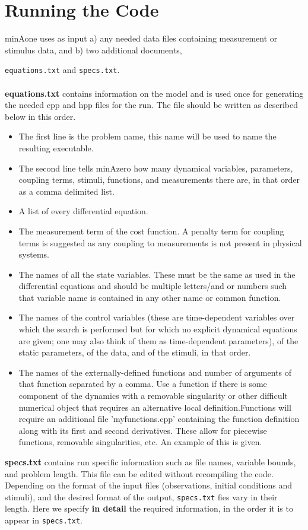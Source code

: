 \documentclass[11pt]{article}
\begin{document}
\section{Running the Code}
minAone uses as input a) any needed data files containing measurement or stimulus data, and b) two additional documents, {\texttt{equations.txt} and \texttt{specs.txt}.  
\\ \\
{\bf equations.txt} contains information on the model and is used once for generating the needed cpp and hpp files for the run.  The file should be written as described below in this order.

\begin{itemize}
\item The first line is the problem name, this name will be used to name the resulting executable.
\item The second line tells minAzero how many dynamical variables, parameters, coupling terms, stimuli, functions, and measurements there are, in that order as a comma delimited list. 

\item A list of every differential equation.

\item The measurement term of the cost function.  A penalty term for coupling terms is suggested as any coupling to measurements is not present in physical systems.

\item The names of all the state variables.  These must be the same as used in the differential equations and should be multiple letters/and or numbers such that variable name is contained in any other name or common function.
\item The names of the control variables (these are time-dependent variables over which the search is performed but for which no explicit dynamical equations are given; one may also think of them as time-dependent parameters), of the static parameters, of the data, and of the stimuli, in that order.
\item The names of the externally-defined functions and number of arguments of that function separated by a comma.  Use a function if there is some component of the dynamics with a removable singularity or other difficult numerical object that requires an alternative local definition.Functions will require an additional file 'myfunctions.cpp' containing the function definition along with its first and second derivatives. These allow for piecewise functions, removable singularities, etc. An example of this is given.
\end{itemize}
\bigskip
\pagebreak
{\bf specs.txt} contains run specific information such as file names, variable bounds, and problem length.  This file can be edited without recompiling the code. Depending on the format of the input files (observations, initial conditions and stimuli), and the desired format of the output, \texttt{specs.txt} fies vary in their length. Here we specify {\bf  in detail} the required information, in the order it is to appear in \texttt{specs.txt}.

}
\end{document}
